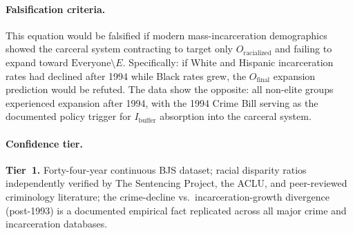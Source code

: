 \paragraph{Falsification criteria.}
This equation would be falsified if modern mass-incarceration demographics showed the carceral system contracting to target only $O_{\text{racialized}}$ and failing to expand toward $\text{Everyone} \setminus E$. Specifically: if White and Hispanic incarceration rates had declined after 1994 while Black rates grew, the $O_{\text{final}}$ expansion prediction would be refuted. The data show the opposite: all non-elite groups experienced expansion after 1994, with the 1994 Crime Bill serving as the documented policy trigger for $I_{\text{buffer}}$ absorption into the carceral system.

\paragraph{Confidence tier.}
\textbf{Tier~1.} Forty-four-year continuous BJS dataset; racial disparity ratios independently verified by The Sentencing Project, the ACLU, and peer-reviewed criminology literature; the crime-decline vs.\ incarceration-growth divergence (post-1993) is a documented empirical fact replicated across all major crime and incarceration databases.

